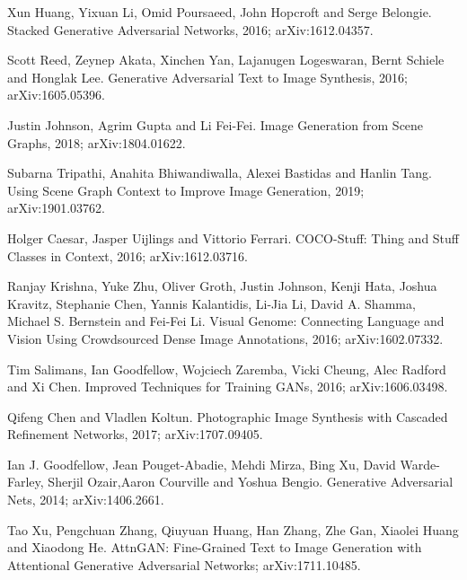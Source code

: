 \documentclass{article}
\begin{document}
\begin{thebibliography}{1}

\medskip
\small


Xun Huang, Yixuan Li, Omid Poursaeed, John Hopcroft and Serge Belongie.
\newblock Stacked Generative Adversarial Networks, 2016;
\newblock arXiv:1612.04357.

Scott Reed, Zeynep Akata, Xinchen Yan, Lajanugen Logeswaran, Bernt Schiele and Honglak Lee.
\newblock Generative Adversarial Text to Image Synthesis, 2016;
\newblock arXiv:1605.05396.

Justin Johnson, Agrim Gupta and Li Fei-Fei.
\newblock Image Generation from Scene Graphs, 2018;
\newblock arXiv:1804.01622.

Subarna Tripathi, Anahita Bhiwandiwalla, Alexei Bastidas and Hanlin Tang.
\newblock Using Scene Graph Context to Improve Image Generation, 2019;
\newblock arXiv:1901.03762.

Holger Caesar, Jasper Uijlings and Vittorio Ferrari.
\newblock COCO-Stuff: Thing and Stuff Classes in Context, 2016;
\newblock arXiv:1612.03716.

Ranjay Krishna, Yuke Zhu, Oliver Groth, Justin Johnson, Kenji Hata, Joshua Kravitz, Stephanie Chen, Yannis Kalantidis, Li-Jia Li, David A. Shamma, Michael S. Bernstein and Fei-Fei Li.
\newblock Visual Genome: Connecting Language and Vision Using Crowdsourced Dense Image Annotations, 2016;
\newblock arXiv:1602.07332.

Tim Salimans, Ian Goodfellow, Wojciech Zaremba, Vicki Cheung, Alec Radford and Xi Chen.
\newblock Improved Techniques for Training GANs, 2016;
\newblock arXiv:1606.03498.


Qifeng Chen and Vladlen Koltun.
\newblock Photographic Image Synthesis with Cascaded Refinement Networks, 2017;
\newblock arXiv:1707.09405.

Ian J. Goodfellow,
Jean Pouget-Abadie, Mehdi Mirza, Bing Xu, David Warde-Farley, Sherjil Ozair,Aaron Courville and Yoshua Bengio.
\newblock Generative Adversarial Nets, 2014;
\newblock arXiv:1406.2661.

Tao Xu, Pengchuan Zhang, Qiuyuan Huang,
Han Zhang, Zhe Gan, Xiaolei Huang and Xiaodong He.
\newblock AttnGAN: Fine-Grained Text to Image Generation with Attentional Generative Adversarial Networks;
\newblock arXiv:1711.10485.


\end{thebibliography}
\end{document}
